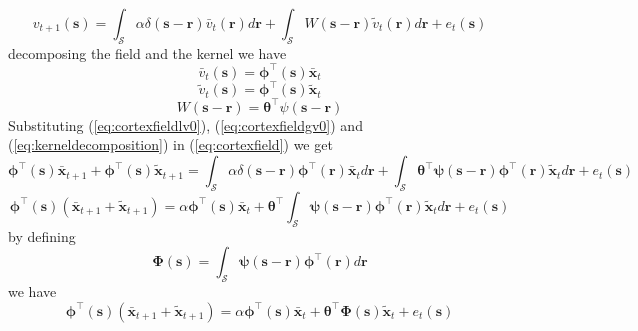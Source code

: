 \documentclass[a4paper,12pt]{article}
\begin{document}
\begin{equation}
 v_{t+1}(\mathbf s)=\int_{\mathcal S} \alpha \delta(\mathbf s-\mathbf r)\bar v_t(\mathbf r)d \mathbf r+\int_{\mathcal S} W(\mathbf s -\mathbf r)\tilde v_t(\mathbf r)d\mathbf r+e_t(\mathbf s)
\label{eq:cortexfield}
\end{equation}
decomposing the field and the kernel we have
\begin{equation}
\bar v_t(\mathbf s)=\boldsymbol \phi^{\top}(\mathbf s)\bar{\mathbf x}_t
\label{eq:cortexfieldlv0}
\end{equation}
\begin{equation}
\tilde v_t(\mathbf s)=\boldsymbol \phi^{\top}(\mathbf s)\tilde{\mathbf x}_t
\label{eq:cortexfieldgv0}
\end{equation}
\begin{equation}
 W(\mathbf s -\mathbf r)=\boldsymbol \theta^{\top}\psi(\mathbf s -\mathbf r)
\label{eq:kerneldecomposition}
\end{equation}
Substituting (\ref{eq:cortexfieldlv0}), (\ref{eq:cortexfieldgv0}) and (\ref{eq:kerneldecomposition}) in (\ref{eq:cortexfield}) we get
\begin{equation}
 \boldsymbol \phi^{\top}(\mathbf s)\bar{\mathbf x}_{t+1}+\boldsymbol \phi^{\top}(\mathbf s)\tilde{\mathbf x}_{t+1}=
\int_\mathcal{S}\alpha\delta(\mathbf s- \mathbf r)\boldsymbol\phi^{\top}(\mathbf r)\bar{\mathbf x}_td\mathbf r+\int_\mathcal{S}\boldsymbol \theta^{\top}\boldsymbol\psi(\mathbf s -\mathbf r)\boldsymbol\phi^{\top}(\mathbf r)\tilde{\mathbf x}_td\mathbf r+e_t(\mathbf s)
\label{eq:decomposedcortexfield}
\end{equation}
\begin{equation}
 \boldsymbol \phi^{\top}(\mathbf s)(\bar{\mathbf x}_{t+1}+\tilde{\mathbf x}_{t+1})=\alpha \boldsymbol\phi^{\top}(\mathbf s)\bar{\mathbf x}_{t}+\boldsymbol \theta^{\top}\int_{\mathcal S}\boldsymbol\psi(\mathbf s -\mathbf r)\boldsymbol\phi^{\top}(\mathbf r)\tilde{\mathbf x}_td\mathbf r+e_t(\mathbf s)
\end{equation}
by defining
\begin{equation}
 \boldsymbol\Phi(\mathbf s)=\int_{\mathcal S}\boldsymbol\psi(\mathbf s -\mathbf r)\boldsymbol\phi^{\top}(\mathbf r)d\mathbf r
\label{eq:convolution}
\end{equation}
we have
\begin{equation}
 \boldsymbol \phi^{\top}(\mathbf s)(\bar{\mathbf x}_{t+1}+\tilde{\mathbf x}_{t+1})=\alpha \boldsymbol\phi^{\top}(\mathbf s)\bar{\mathbf x}_{t}+\boldsymbol \theta^{\top}\boldsymbol\Phi(\mathbf s)\tilde{\mathbf x}_t+e_t(\mathbf s)
\label{eq:cortexfieldwithPhi}
\end{equation}
\end{document}
